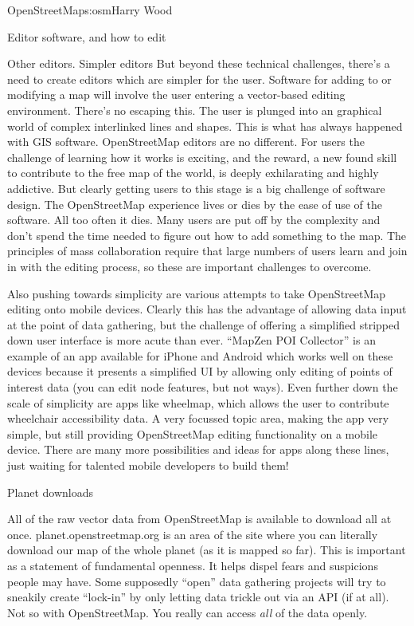\begin{aosachapter}{OpenStreetMap}{s:osm}{Harry Wood}
\begin{aosasect1}{Editor software, and how to edit}
\begin{aosasect2}{Other editors. Simpler editors}
But beyond these technical challenges, there's a need to create
editors which are simpler for the user. Software for adding to or
modifying a map will involve the user entering a vector-based editing
environment. There's no escaping this. The user is plunged into an
graphical world of complex interlinked lines and shapes. This is what
has always happened with GIS software. OpenStreetMap editors are no
different. For users the challenge of learning how it works is
exciting, and the reward, a new found skill to contribute to the free
map of the world, is deeply exhilarating and highly addictive. But
clearly getting users to this stage is a big challenge of software
design. The OpenStreetMap experience lives or dies by the ease of use
of the software. All too often it dies. Many users are put off by the
complexity and don't spend the time needed to figure out how to add
something to the map. The principles of mass collaboration require
that large numbers of users learn and join in with the editing
process, so these are important challenges to overcome.

Also pushing towards simplicity are various attempts to take
OpenStreetMap editing onto mobile devices. Clearly this has the
advantage of allowing data input at the point of data gathering, but
the challenge of offering a simplified stripped down user interface is
more acute than ever. ``MapZen POI Collector'' is an example of an app
available for iPhone and Android which works well on these devices
because it presents a simplified UI by allowing only editing of points
of interest data (you can edit node features, but not ways). Even
further down the scale of simplicity are apps like wheelmap, which
allows the user to contribute wheelchair accessibility data. A very
focussed topic area, making the app very simple, but still providing
OpenStreetMap editing functionality on a mobile device. There are many
more possibilities and ideas for apps along these lines, just waiting
for talented mobile developers to build them!

\end{aosasect2}

\end{aosasect1}

\begin{aosasect1}{Planet downloads}

All of the raw vector data from OpenStreetMap is available to download
all at once. planet.openstreetmap.org is an area of the site where you
can literally download our map of the whole planet (as it is mapped so
far). This is important as a statement of fundamental openness. It
helps dispel fears and suspicions people may have. Some supposedly
``open'' data gathering projects will try to sneakily create
``lock-in'' by only letting data trickle out via an API (if at
all). Not so with OpenStreetMap. You really can access \emph{all} of
the data openly.


\end{aosasect1}
\end{aosachapter}
